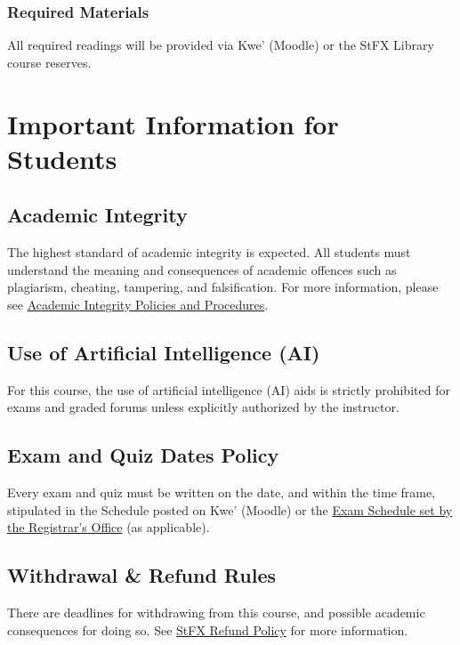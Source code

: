\documentclass[12pt]{article}
\begin{document}
\subsubsection*{Required Materials}

All required readings will be provided via Kwe’ (Moodle) or the StFX Library course reserves.

\section*{Important Information for Students}

\subsection*{Academic Integrity}

The highest standard of academic integrity is expected. All students must understand the meaning and consequences of academic offences such as plagiarism, cheating, tampering, and falsification. For more information, please see \href{https://www.stfx.ca/student-services/academic-services/academic-success-centre/academic-integrity}{Academic Integrity Policies and Procedures}.

\subsection*{Use of Artificial Intelligence (AI)}

For this course, the use of artificial intelligence (AI) aids is strictly prohibited for exams and graded forums unless explicitly authorized by the instructor.

\subsection*{Exam and Quiz Dates Policy}

Every exam and quiz must be written on the date, and within the time frame, stipulated in the Schedule posted on Kwe’ (Moodle) or the \href{https://www.stfx.ca/applications-admissions/registrars-office/examinations}{Exam Schedule set by the Registrar’s Office} (as applicable).

\subsection*{Withdrawal \& Refund Rules}

There are deadlines for withdrawing from this course, and possible academic consequences for doing so. See \href{https://drive.google.com/file/d/1PyNFH_oOmuxQtN2hc7oxZXAcQaHOnOAJ/view}{StFX Refund Policy} for more information.
\end{document}
